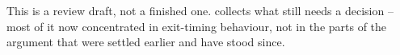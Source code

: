 \documentclass{article}
\begin{document}
This is a review draft, not a finished one.  collects what still needs a
decision -- most of it now concentrated in exit-timing behaviour, not in the parts of the
argument that were settled earlier and have stood since.



\end{document}

